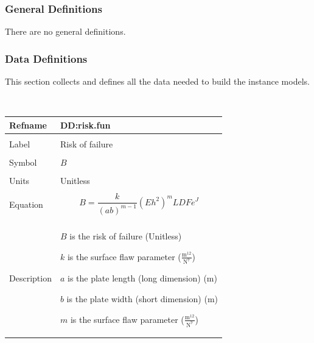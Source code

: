 \documentclass[12pt]{article}
\begin{document}
\subsubsection{General Definitions}
\label{Sec:GDs}
There are no general definitions.
\subsubsection{Data Definitions}
\label{Sec:DDs}
This section collects and defines all the data needed to build the instance models.
\par~

\noindent \begin{minipage}{\textwidth}
\begin{tabular}{p{} p{}}
\toprule \textbf{Refname} & \textbf{DD:risk.fun}
\label{DD:risk.fun}
\\ \midrule \\
Label & Risk of failure
        \\ \midrule \\
        Symbol & $B$
                 \\ \midrule \\
                 Units & Unitless
                         \\ \midrule \\
                         Equation & \begin{displaymath}
                                    B=\frac{k}{\left(a b\right)^{m-1}} \left(E h^{2}\right)^{m} LDF e^{J}
                                    \end{displaymath}
                                    \\ \midrule \\
                                    Description & \begin{symbDescription}
                                                  \item{$B$ is the risk of failure (Unitless)}
                                                  \item{$k$ is the surface flaw parameter ($\frac{\text{m}^{12}}{\text{N}^{7}}$)}
                                                  \item{$a$ is the plate length (long dimension) (m)}
                                                  \item{$b$ is the plate width (short dimension) (m)}
                                                  \item{$m$ is the surface flaw parameter ($\frac{\text{m}^{12}}{\text{N}^{7}}$)}

\end{symbDescription}
\end{tabular}
\end{minipage}
\end{document}
